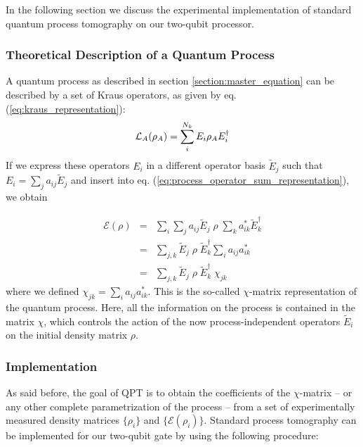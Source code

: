 \smallskip

In the following section we discuss the experimental implementation of standard quantum process tomography on our two-qubit processor.

\subsubsection{Theoretical Description of a Quantum Process}

A quantum process as described in section \ref{section:master_equation} can be described by a set of Kraus operators, as given by eq. (\ref{eq:kraus_representation}):
%
\begin{equation}
\LA{A}(\rho_A) = \sum\limits_i^{N_k} E_i \rho_A E_i^\dagger \label{eq:kraus_representation}
\end{equation}
%
If we express these operators $E_i$ in a different operator basis $\tilde{E}_j$ such that $E_i = \sum_j a_{ij} \tilde{E}_{j}$ and insert into eq. (\ref{eq:process_operator_sum_representation}), we obtain

\begin{eqnarray}
 \mathcal{E}(\rho) & = & \sum\limits_i \sum\limits_j a_{ij} \tilde{E}_j \;\rho\; \sum\limits_k a_{ik}^* \tilde{E}_k^\dagger \\
& = & \sum\limits_{j,k}\tilde{E}_j \; \rho \; \tilde{E}_k^\dagger \sum\limits_i a_{ij} a_{ik}^* \\
& = & \sum\limits_{j,k}\tilde{E}_j \; \rho \; \tilde{E}_k^\dagger \; \chi_{jk} \label{eq:process_chi_representation}
\end{eqnarray}
where we defined $\chi_{jk} = \sum\limits_i a_{ij} a_{ik}^*$. This is the so-called $\chi$-matrix representation of the quantum process. Here, all the information on the process is contained in the matrix $\chi$, which controls the action of the now process-independent operators $\tilde{E}_i$ on the initial density matrix $\rho$.

\subsubsection{Implementation}

As said before, the goal of QPT is to obtain the coefficients of the $\chi$-matrix -- or any other complete parametrization of the process -- from a set of experimentally measured density matrices $\{\rho_i\}$ and $\{\mathcal{E}(\rho_i)\}$. Standard process tomography \citep{nielsen_quantum_2000,poyatos_complete_1997} can be implemented for our two-qubit gate by using the following procedure:

